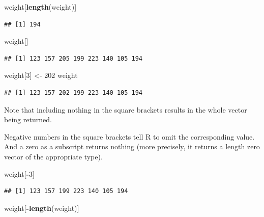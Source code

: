 \documentclass[
]{krantz}
\newenvironment{Shaded}{\begin{snugshade}}{\end{snugshade}}
\newcommand{\DecValTok}[1]{\textcolor[rgb]{0.00,0.00,0.81}{#1}}
\newcommand{\KeywordTok}[1]{\textcolor[rgb]{0.13,0.29,0.53}{\textbf{#1}}}
\newcommand{\NormalTok}[1]{#1}
\newcommand{\OperatorTok}[1]{\textcolor[rgb]{0.81,0.36,0.00}{\textbf{#1}}}
\newcommand{\StringTok}[1]{\textcolor[rgb]{0.31,0.60,0.02}{#1}}
\begin{document}
\begin{Shaded}
\begin{Highlighting}[]
\NormalTok{weight[}\KeywordTok{length}\NormalTok{(weight)]}
\end{Highlighting}
\end{Shaded}

\begin{verbatim}
## [1] 194
\end{verbatim}

\begin{Shaded}
\begin{Highlighting}[]
\NormalTok{weight[]}
\end{Highlighting}
\end{Shaded}

\begin{verbatim}
## [1] 123 157 205 199 223 140 105 194
\end{verbatim}

\begin{Shaded}
\begin{Highlighting}[]
\NormalTok{weight[}\DecValTok{3}\NormalTok{] \textless{}{-}}\StringTok{ }\DecValTok{202}
\NormalTok{weight}
\end{Highlighting}
\end{Shaded}

\begin{verbatim}
## [1] 123 157 202 199 223 140 105 194
\end{verbatim}

Note that including nothing in the square brackets results in the whole vector being returned.

Negative numbers in the square brackets tell R to omit the corresponding value. And a zero as a subscript returns nothing (more precisely, it returns a length zero vector of the appropriate type).

\begin{Shaded}
\begin{Highlighting}[]
\NormalTok{weight[}\OperatorTok{{-}}\DecValTok{3}\NormalTok{]}
\end{Highlighting}
\end{Shaded}

\begin{verbatim}
## [1] 123 157 199 223 140 105 194
\end{verbatim}

\begin{Shaded}
\begin{Highlighting}[]
\NormalTok{weight[}\OperatorTok{{-}}\KeywordTok{length}\NormalTok{(weight)]}
\end{Highlighting}
\end{Shaded}
\end{document}
